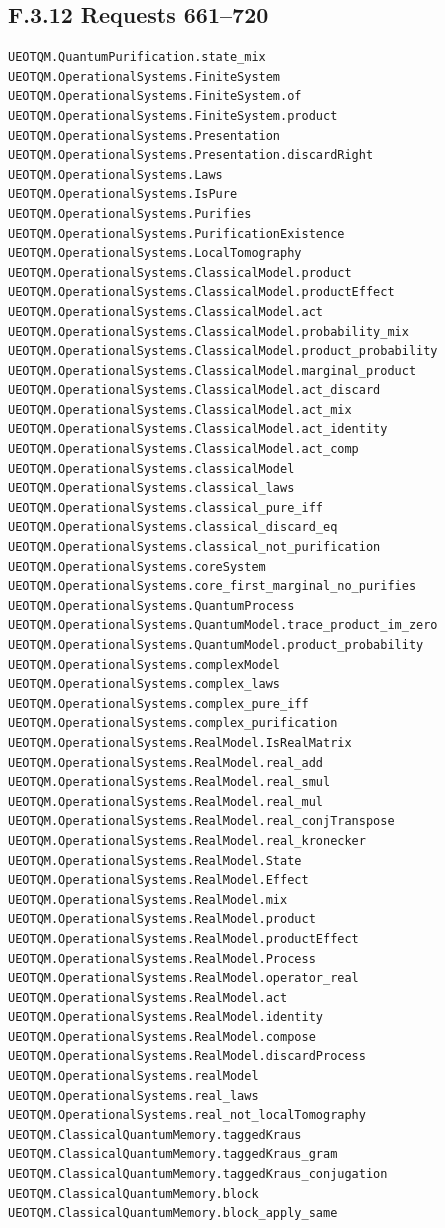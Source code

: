 \documentclass[
  11pt,
  oneside]{book}
\begin{document}
\subsection{F.3.12 Requests 661--720}

\begin{Verbatim}[breaklines,breakanywhere,fontsize=\scriptsize]
UEOTQM.QuantumPurification.state_mix
UEOTQM.OperationalSystems.FiniteSystem
UEOTQM.OperationalSystems.FiniteSystem.of
UEOTQM.OperationalSystems.FiniteSystem.product
UEOTQM.OperationalSystems.Presentation
UEOTQM.OperationalSystems.Presentation.discardRight
UEOTQM.OperationalSystems.Laws
UEOTQM.OperationalSystems.IsPure
UEOTQM.OperationalSystems.Purifies
UEOTQM.OperationalSystems.PurificationExistence
UEOTQM.OperationalSystems.LocalTomography
UEOTQM.OperationalSystems.ClassicalModel.product
UEOTQM.OperationalSystems.ClassicalModel.productEffect
UEOTQM.OperationalSystems.ClassicalModel.act
UEOTQM.OperationalSystems.ClassicalModel.probability_mix
UEOTQM.OperationalSystems.ClassicalModel.product_probability
UEOTQM.OperationalSystems.ClassicalModel.marginal_product
UEOTQM.OperationalSystems.ClassicalModel.act_discard
UEOTQM.OperationalSystems.ClassicalModel.act_mix
UEOTQM.OperationalSystems.ClassicalModel.act_identity
UEOTQM.OperationalSystems.ClassicalModel.act_comp
UEOTQM.OperationalSystems.classicalModel
UEOTQM.OperationalSystems.classical_laws
UEOTQM.OperationalSystems.classical_pure_iff
UEOTQM.OperationalSystems.classical_discard_eq
UEOTQM.OperationalSystems.classical_not_purification
UEOTQM.OperationalSystems.coreSystem
UEOTQM.OperationalSystems.core_first_marginal_no_purifies
UEOTQM.OperationalSystems.QuantumProcess
UEOTQM.OperationalSystems.QuantumModel.trace_product_im_zero
UEOTQM.OperationalSystems.QuantumModel.product_probability
UEOTQM.OperationalSystems.complexModel
UEOTQM.OperationalSystems.complex_laws
UEOTQM.OperationalSystems.complex_pure_iff
UEOTQM.OperationalSystems.complex_purification
UEOTQM.OperationalSystems.RealModel.IsRealMatrix
UEOTQM.OperationalSystems.RealModel.real_add
UEOTQM.OperationalSystems.RealModel.real_smul
UEOTQM.OperationalSystems.RealModel.real_mul
UEOTQM.OperationalSystems.RealModel.real_conjTranspose
UEOTQM.OperationalSystems.RealModel.real_kronecker
UEOTQM.OperationalSystems.RealModel.State
UEOTQM.OperationalSystems.RealModel.Effect
UEOTQM.OperationalSystems.RealModel.mix
UEOTQM.OperationalSystems.RealModel.product
UEOTQM.OperationalSystems.RealModel.productEffect
UEOTQM.OperationalSystems.RealModel.Process
UEOTQM.OperationalSystems.RealModel.operator_real
UEOTQM.OperationalSystems.RealModel.act
UEOTQM.OperationalSystems.RealModel.identity
UEOTQM.OperationalSystems.RealModel.compose
UEOTQM.OperationalSystems.RealModel.discardProcess
UEOTQM.OperationalSystems.realModel
UEOTQM.OperationalSystems.real_laws
UEOTQM.OperationalSystems.real_not_localTomography
UEOTQM.ClassicalQuantumMemory.taggedKraus
UEOTQM.ClassicalQuantumMemory.taggedKraus_gram
UEOTQM.ClassicalQuantumMemory.taggedKraus_conjugation
UEOTQM.ClassicalQuantumMemory.block
UEOTQM.ClassicalQuantumMemory.block_apply_same
\end{Verbatim}
\end{document}
